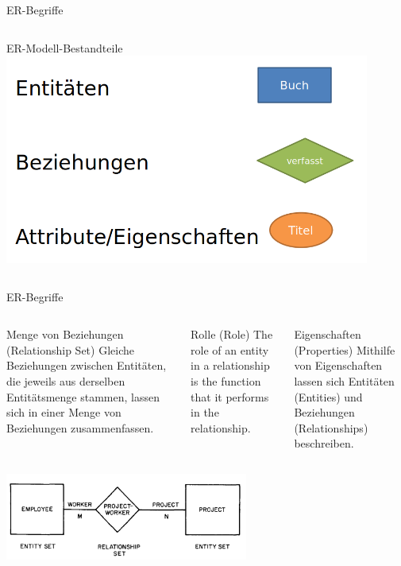 \begin{frame}{ER-Begriffe~\parencite[9--12]{chen1976}}
\begin{columns}[T,onlytextwidth]
      \begin{block}{ER-Modell-Bestandteile}
      \includegraphics[width=0.9\textwidth]{img/er-bsp2.png}
      \end{block}
  \end{columns}

\end{frame}

\begin{frame}{ER-Begriffe~\parencite[9--12]{chen1976}}
  \begin{columns}[T,onlytextwidth]
    \footnotesize
      \begin{exampleblock}{Menge von Beziehungen (Relationship Set)}
        Gleiche Beziehungen zwischen Entitäten, die jeweils aus derselben Entitätsmenge stammen, lassen sich in einer Menge von Beziehungen zusammenfassen. 
      \end{exampleblock}



      \begin{block}{Rolle (Role)} \footnotesize
        The role of an entity in a relationship is the function that it performs in the relationship.
      \end{block}
      
      \begin{alertblock}{Eigenschaften (Properties)}\footnotesize
        Mithilfe von Eigenschaften lassen sich Entitäten (Entities) und Beziehungen (Relationships) beschreiben. 
      \end{alertblock}
  \end{columns}
  \begin{center}
      \includegraphics[width=0.6\textwidth]{img/er-bsp.png}
  \end{center}
\end{frame}

